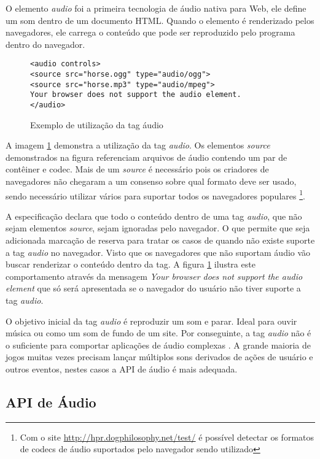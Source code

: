 O elemento \textit{audio} foi a primeira tecnologia de áudio nativa
para Web, ele define um som dentro de um documento HTML. Quando o
elemento é renderizado pelos navegadores, ele carrega o conteúdo que
pode ser reproduzido pelo programa dentro do navegador.

\begin{figure}[H]
\centering
\begin{verbatim}
<audio controls>
<source src="horse.ogg" type="audio/ogg">
<source src="horse.mp3" type="audio/mpeg">
Your browser does not support the audio element.
</audio>
\end{verbatim}
\caption{Exemplo de utilização da tag áudio}
\label{fig:htmlAudio}
\end{figure}

A imagem \ref{fig:htmlAudio} demonstra a utilização da tag
\textit{audio}. Os elementos \textit{source} demonstrados na figura
referenciam arquivos de áudio contendo um par de contêiner
e codec. Mais de um \textit{source } é necessário pois os
criadores de navegadores não chegaram a um consenso sobre qual
formato deve ser usado, sendo necessário utilizar vários para
suportar todos os navegadores populares \footnote{Com o site
\url{http://hpr.dogphilosophy.net/test/} é possível detectar os
formatos de codecs de áudio suportados pelo navegador sendo utilizado}.

A especificação declara que todo o conteúdo dentro de uma tag
\textit{audio}, que não sejam elementos \textit{source}, sejam
ignoradas pelo navegador. O que permite que seja adicionada marcação
de reserva para tratar os casos de quando não existe suporte a tag
\textit{audio} no navegador. Visto que os navegadores que não suportam
áudio vão buscar renderizar o conteúdo dentro da tag. A figura
\ref{fig:htmlAudio} ilustra este comportamento através da mensagem
\textit{Your browser does not support the audio element } que só
será apresentada se o navegador do usuário não tiver suporte a tag
\textit{audio}.

O objetivo inicial da tag \textit{audio} é reproduzir um som e parar.
Ideal para ouvir música ou como um som de fundo de um site. Por
conseguinte, a tag \textit{audio} não é o suficiente para comportar
aplicações de áudio complexas \autocite{audioApiSpec}. A grande
maioria de jogos muitas vezes precisam lançar múltiplos sons derivados
de ações de usuário e outros eventos, nestes casos a API de áudio é
mais adequada.

\subsection{API de Áudio}

